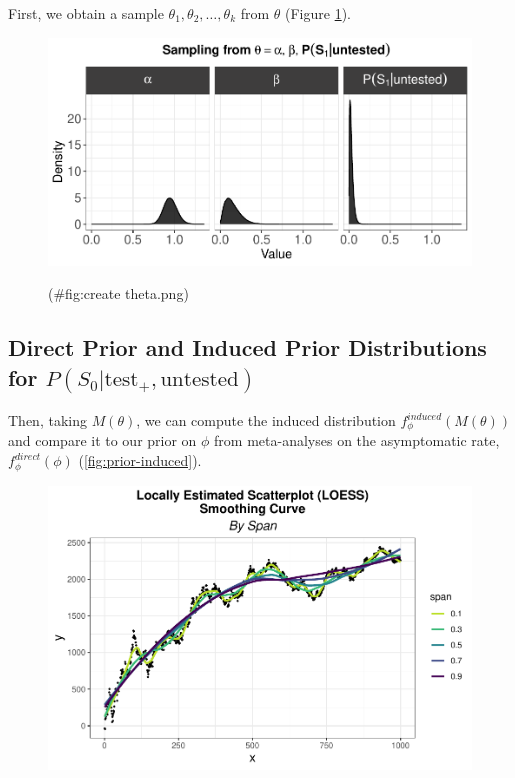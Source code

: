 \documentclass[12pt,twoside]{smiththesis}
\begin{document}
First, we obtain a sample \(\theta_1, \theta_2, \dots, \theta_k\) from \(\theta\) (Figure \ref{fig:theta}).
\begin{figure}

{\centering \includegraphics[width=1\linewidth]{thesis_files/figure-latex/create theta.png-1} 

}

\caption{\label{fig:theta}}(\#fig:create theta.png)
\end{figure}
\hypertarget{direct-prior-and-induced-prior-distributions-for-ps_0texttest_textuntested}{%
\subsection{\texorpdfstring{Direct Prior and Induced Prior Distributions for \(P(S_0|\text{test}_+,\text{untested})\)}{Direct Prior and Induced Prior Distributions for P(S\_0\textbar\textbackslash text\{test\}\_+,\textbackslash text\{untested\})}}\label{direct-prior-and-induced-prior-distributions-for-ps_0texttest_textuntested}}

Then, taking \(M(\theta)\), we can compute the induced distribution \(f_\phi^{induced}(M(\theta))\) and compare it to our prior on \(\phi\) from meta-analyses on the asymptomatic rate, \(f_\phi^{direct}(\phi)\) (\ref{fig:prior-induced}).
\begin{figure}

{\centering \includegraphics[width=1\linewidth]{thesis_files/figure-latex/unnamed-chunk-19-1} 

}

\caption{\label{fig:prior-induced}}\label{fig:unnamed-chunk-19}
\end{figure}
\newpage
\end{document}
